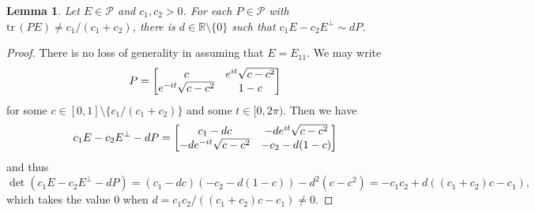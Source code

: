 \documentclass[10pt]{amsart}
\newtheorem{lemma}[theorem]{Lemma}
\theoremstyle{definition}
\theoremstyle{remark}
\numberwithin{subsection}{section}
\numberwithin{equation}{section}
\newcommand\cP{{\mathcal{P}}}
\begin{document}
\begin{lemma}
Let $E\in \cP$ and $c_1, c_2>0$. 
For each $P\in \cP$ with $\mathrm{tr}\, (PE)\neq c_1/(c_1+c_2)$, there is $d\in\mathbb{R}\setminus\{0\}$ such that $c_1E-c_2E^\perp\sim dP$. 
\end{lemma}
\begin{proof}
There is no loss of generality in assuming that $E=E_{11}$. 
We may write 
\[
P=\left[ \begin{matrix} c & e^{it}\sqrt{c-c^2}  \cr e^{-it}\sqrt{c-c^2} & 1-c \cr \end{matrix} \right]
\]
for some $c\in [0,1]\setminus\{c_1/(c_1+c_2)\}$ and some $t\in [0,2\pi)$. 
Then we have 
\[
c_1E-c_2E^\perp- dP = \left[ \begin{matrix} c_1-dc & -de^{it}\sqrt{c-c^2}  \cr -de^{-it}\sqrt{c-c^2} & -c_2-d(1-c) \cr \end{matrix} \right]
\]
and thus 
\[
\det(c_1E-c_2E^\perp- dP) = (c_1-dc)(-c_2-d(1-c)) - d^2(c-c^2) = -c_1c_2+d((c_1+c_2)c-c_1),
\]
which takes the value $0$ when $d=c_1c_2/((c_1+c_2)c-c_1)\neq 0$.
\end{proof}
\end{document}
